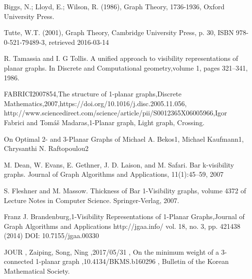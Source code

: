 
\clearpage
\renewcommand\bibname{References}

% 




\begin{thebibliography}{9}

Biggs, N.; Lloyd, E.; Wilson, R. (1986), Graph Theory, 1736-1936, Oxford University Press.

Tutte, W.T. (2001), Graph Theory, Cambridge University Press, p. 30, ISBN 978-0-521-79489-3, retrieved 2016-03-14


R. Tamassia and I. G Tollis. A unified approach to visibility representations of planar graphs. In Discrete and Computational geometry,volume 1, pages 321–341, 1986.



FABRICI2007854,The structure of 1-planar graphs,Discrete Mathematics,2007,https://doi.org/10.1016/j.disc.2005.11.056, http://www.sciencedirect.com/science/article/pii/S0012365X06005966,Igor Fabrici and Tomáš Madaras,1-Planar graph, Light graph, Crossing.


On Optimal 2- and 3-Planar Graphs of Michael A. Bekos1, Michael Kaufmann1, Chrysanthi N. Raftopoulou2




M. Dean, W. Evans, E. Gethner, J. D. Laison, and M. Safari. Bar k-visibility graphs. Journal of Graph Algorithms and Applications, 11(1):45–59, 2007



S. Fleshner and M. Massow. Thickness of Bar 1-Visibility graphs, volume 4372 of Lecture Notes in Computer Science. Springer-Verlag, 2007.



Franz J. Brandenburg,1-Visibility Representations of 1-Planar Graphs,Journal of Graph Algorithms and Applications http://jgaa.info/ vol. 18, no. 3, pp. 421{438 (2014) DOI: 10.7155/jgaa.00330}




JOUR , Zaiping, Song, Ning ,2017/05/31 , On the minimum weight of a 3-connected 1-planar graph ,10.4134/BKMS.b160296 , Bulletin of the Korean Mathematical Society.




\end{thebibliography}
